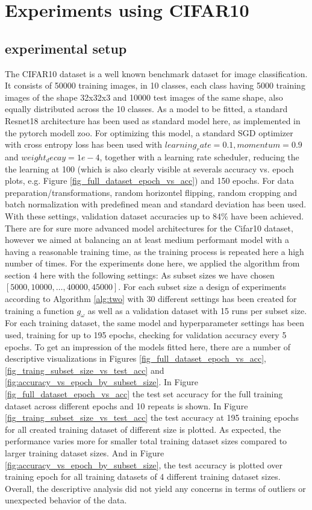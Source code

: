 \documentclass{article} %
\begin{document}
\section{Experiments using CIFAR10}

\subsection{experimental setup}
The CIFAR10 dataset \cite{Cifar10} is a well known benchmark dataset for image classification.
It consists of 50000 training images, in 10 classes, each class having 5000 training images of the shape 32x32x3 and 10000 test images of the same shape, also equally distributed across the 10 classes.
As a model to be fitted, a standard Resnet18 architecture \cite{he2015resnet} has been used as standard model here, as implemented in the pytorch \cite{pytorch} modell zoo.
For optimizing this model, a standard SGD optimizer with cross entropy loss has been used with $learning_rate = 0.1, momentum=0.9$ and $weight_decay=1e-4$, together with a learning rate scheduler, reducing the the learning at 100 (which is also clearly visible at severals accuracy vs. epoch plots, e.g. Figure \ref{fig_full_dataset_epoch_vs_acc}) and 150 epochs.
For data preparation/transformations, random horizontel flipping, random cropping and batch normalization with predefined mean and standard deviation  has been used.
With these settings, validation dataset accuracies up to 84\% have been achieved.
There are for sure more advanced model architectures for the Cifar10 dataset, however we aimed at balancing an at least medium performant model with a having a reasonable training time, as the training process is repeated here a high number of times.
For the experiments done here, we applied the algorithm from section 4 here with the following settings:
As subset sizes we have chosen $[5000, 10000, \dots, 40000, 45000]$. For each subset size a design of experiments according to Algorithm \ref{alg:two} with 30 different settings has been created for training a function $g_{\omega}$ as well as a validation dataset with 15 runs per subset size.
For each training dataset, the same model and hyperparameter settings has been used, training for up to 195 epochs, checking for validation accuracy every 5 epochs.
To get an impression of the models fitted here, there are a number of descriptive visualizations in Figures \ref{fig_full_dataset_epoch_vs_acc}, \ref{fig_traing_subset_size_vs_test_acc} and \ref{fig:accuracy_vs_epoch_by_subset_size}. In Figure \ref{fig_full_dataset_epoch_vs_acc} the test set accuracy for the full training dataset across different epochs and 10 repeats is shown.
In Figure \ref{fig_traing_subset_size_vs_test_acc} the test accuracy at 195 training epochs for all created training dataset of different size is plotted. As expected, the performance varies more for smaller total training dataset sizes compared to larger training dataset sizes.
And in Figure \ref{fig:accuracy_vs_epoch_by_subset_size}, the test accuracy is plotted over training epoch for all training datasets of 4 different training dataset sizes.
Overall, the descriptive analysis did not yield any concerns in terms of outliers or unexpected behavior of the data.
\end{document}
